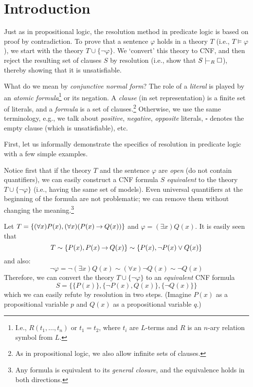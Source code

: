 \section{Introduction}\label{section:predicate-resolution-intro}

Just as in propositional logic, the resolution method in predicate logic is based on proof by contradiction. To prove that a sentence $\varphi$ holds in a theory $T$ (i.e., $T\models\varphi$), we start with the theory $T\cup\{\neg \varphi\}$. We `convert' this theory to CNF, and then reject the resulting set of clauses $S$ by resolution (i.e., show that $S\proves_R\square$), thereby showing that it is unsatisfiable.

What do we mean by \emph{conjunctive normal form}? The role of a \emph{literal} is played by an \emph{atomic formula}\footnote{I.e., $R(t_1,\dots,t_n)$ or $t_1=t_2$, where $t_i$ are $L$-terms and $R$ is an $n$-ary relation symbol from $L$.} or its negation. A \emph{clause} (in set representation) is a finite set of literals, and a \emph{formula} is a set of clauses.\footnote{As in propositional logic, we also allow infinite sets of clauses.} Otherwise, we use the same terminology, e.g., we talk about \emph{positive}, \emph{negative}, \emph{opposite} literals, $\square$ denotes the empty clause (which is unsatisfiable), etc.

First, let us informally demonstrate the specifics of resolution in predicate logic with a few simple examples.

Notice first that if the theory $T$ and the sentence $\varphi$ are \emph{open} (do not contain quantifiers), we can easily construct a CNF formula $S$ \emph{equivalent} to the theory $T\cup\{\neg \varphi\}$ (i.e., having the same set of models). Even universal quantifiers at the beginning of the formula are not problematic; we can remove them without changing the meaning.\footnote{Any formula is equivalent to its \emph{general closure}, and the equivalence holds in both directions.}

\begin{example}
    Let $T=\{(\forall x)P(x),(\forall x)(P(x)\mathbin{\rightarrow} Q(x))\}$ and $\varphi=(\exists x)Q(x)$. It is easily seen that
    $$
    T\sim \{P(x),P(x)\mathbin{\rightarrow} Q(x)\}\sim\{P(x),\neg P(x)\lor Q(x)\}
    $$ 
    and also:
    $$\neg\varphi=\neg(\exists x)Q(x)\sim(\forall x)\neg Q(x)\sim\neg Q(x)$$ 
    Therefore, we can convert the theory $T\cup\{\neg \varphi\}$ to an \emph{equivalent} CNF formula
    $$
    S = \{\{P(x)\},\{\neg P(x),Q(x)\},\{\neg Q(x)\}\}
    $$
    which we can easily refute by resolution in two steps. (Imagine $P(x)$ as a propositional variable $p$ and $Q(x)$ as a propositional variable $q$.)
\end{example}

